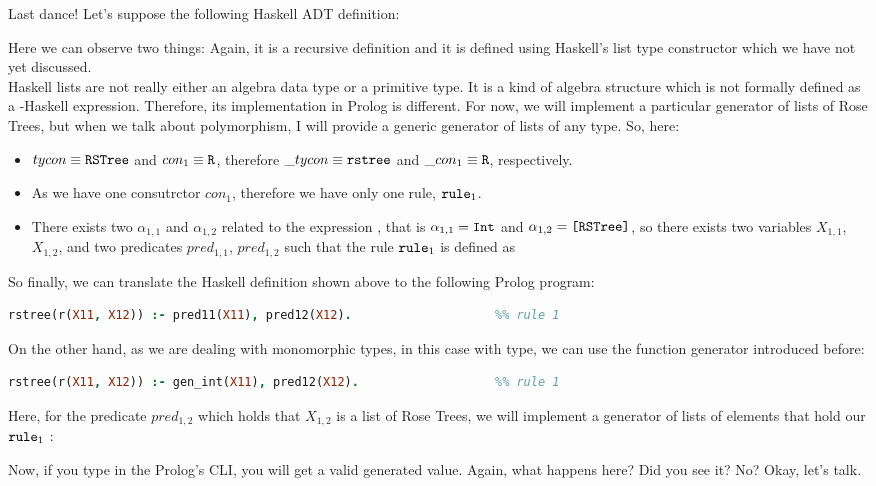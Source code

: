 \begin{example}
	Last dance! Let's suppose the following Haskell ADT definition:
	
	Here we can observe two things: Again, it is a recursive definition and it is defined using Haskell's list type constructor which we have not yet discussed. \\
						
	Haskell lists are not really either an algebra data type or a primitive type. It is a kind of algebra structure which is not formally defined as a -Haskell expression. Therefore, its implementation in Prolog is different. For now, we will implement a particular generator of lists of Rose Trees, but when we talk about polymorphism, I will provide a generic generator of lists of any type. So, here:
	\begin{itemize}
		\item $tycon \equiv \texttt{RSTree}$ and $con_1 \equiv \texttt{R}$, therefore $\_tycon \equiv \texttt{rstree}$ and $\_con_1 \equiv \texttt{R}$, respectively.
		\item As we have one consutrctor $con_1$, therefore we have only one rule, $\texttt{rule}_1$.
		\item There exists two $\alpha_{1,1}$ and $\alpha_{1,2}$ related to the expression , that is $\alpha_{1,1} = \texttt{Int}$ and $\alpha_{1,2} = \texttt{[RSTree]}$, so there exists two variables $X_{1,1}$, $X_{1,2}$, and two predicates $pred_{1,1}$, $pred_{1,2}$ such that the rule $\texttt{rule}_1$ is defined as \\ 
	\end{itemize}
	So finally, we can translate the Haskell definition shown above to the following Prolog program:\\
	\begin{lstlisting}[language=Prolog]
rstree(r(X11, X12)) :- pred11(X11), pred12(X12).					%% rule 1
	\end{lstlisting}
	On the other hand, as we are dealing with monomorphic types, in this case with  type, we can use the  function generator introduced before:\\
	\begin{lstlisting}[language=Prolog]
rstree(r(X11, X12)) :- gen_int(X11), pred12(X12).					%% rule 1
	\end{lstlisting}
	Here, for the predicate $pred_{1,2}$ which holds that $X_{1,2}$ is a list of Rose Trees, we will implement a generator of lists of elements that hold our $\texttt{rule}_1$ :
	
	Now, if you type  in the Prolog's CLI, you will get a valid  generated value. Again, what happens here? Did you see it? No? Okay, let's talk.\\
\end{example}

